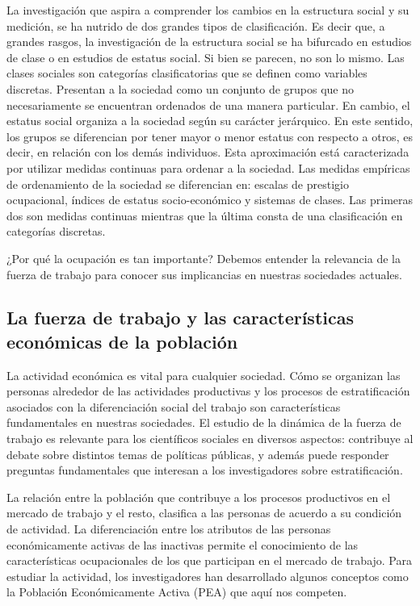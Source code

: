 \documentclass[
]{book}
\begin{document}
La investigación que aspira a comprender los cambios en la estructura social y su medición, se ha nutrido de dos grandes tipos de clasificación. Es decir que, a grandes rasgos, la investigación de la estructura social se ha bifurcado en estudios de clase o en estudios de estatus social. Si bien se parecen, no son lo mismo. Las clases sociales son categorías clasificatorias que se definen como variables discretas. Presentan a la sociedad como un conjunto de grupos que no necesariamente se encuentran ordenados de una manera particular. En cambio, el estatus social organiza a la sociedad según su carácter jerárquico. En este sentido, los grupos se diferencian por tener mayor o menor estatus con respecto a otros, es decir, en relación con los demás individuos. Esta aproximación está caracterizada por utilizar medidas continuas para ordenar a la sociedad. Las medidas empíricas de ordenamiento de la sociedad se diferencian en: escalas de prestigio ocupacional, índices de estatus socio-económico y sistemas de clases. Las primeras dos son medidas continuas mientras que la última consta de una clasificación en categorías discretas.

¿Por qué la ocupación es tan importante? Debemos entender la relevancia de la fuerza de trabajo para conocer sus implicancias en nuestras sociedades actuales.

\hypertarget{la-fuerza-de-trabajo-y-las-caracteruxedsticas-econuxf3micas-de-la-poblaciuxf3n}{%
\subsection{La fuerza de trabajo y las características económicas de la población}\label{la-fuerza-de-trabajo-y-las-caracteruxedsticas-econuxf3micas-de-la-poblaciuxf3n}}

La actividad económica es vital para cualquier sociedad. Cómo se organizan las personas alrededor de las actividades productivas y los procesos de estratificación asociados con la diferenciación social del trabajo son características fundamentales en nuestras sociedades. El estudio de la dinámica de la fuerza de trabajo es relevante para los científicos sociales en diversos aspectos: contribuye al debate sobre distintos temas de políticas públicas, y además puede responder preguntas fundamentales que interesan a los investigadores sobre estratificación.

La relación entre la población que contribuye a los procesos productivos en el mercado de trabajo y el resto, clasifica a las personas de acuerdo a su condición de actividad. La diferenciación entre los atributos de las personas económicamente activas de las inactivas permite el conocimiento de las características ocupacionales de los que participan en el mercado de trabajo. Para estudiar la actividad, los investigadores han desarrollado algunos conceptos como la Población Económicamente Activa (PEA) que aquí nos competen.
\end{document}
